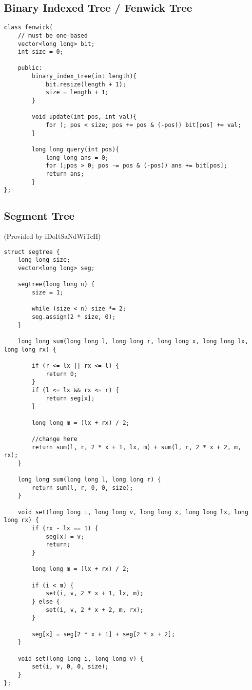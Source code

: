 \documentclass{article}
\begin{document}
\pagebreak
\subsection{Binary Indexed Tree / Fenwick Tree}
\begin{verbatim}
class fenwick{
    // must be one-based
    vector<long long> bit;
    int size = 0;

    public:
        binary_index_tree(int length){
            bit.resize(length + 1);
            size = length + 1;
        }

        void update(int pos, int val){
            for (; pos < size; pos += pos & (-pos)) bit[pos] += val;
        }

        long long query(int pos){
            long long ans = 0;
            for (;pos > 0; pos -= pos & (-pos)) ans += bit[pos];
            return ans;
        }
};
\end{verbatim}

\pagebreak
\subsection{Segment Tree}
(Provided by iDoItSaNdWiTcH)
\begin{verbatim}
struct segtree {
    long long size;
    vector<long long> seg;
    
    segtree(long long n) {
        size = 1;
    
        while (size < n) size *= 2;
        seg.assign(2 * size, 0);
    }
    
    long long sum(long long l, long long r, long long x, long long lx, long long rx) {
        
        if (r <= lx || rx <= l) {
            return 0;
        }
        if (l <= lx && rx <= r) {
            return seg[x];
        }
    
        long long m = (lx + rx) / 2;
    
        //change here
        return sum(l, r, 2 * x + 1, lx, m) + sum(l, r, 2 * x + 2, m, rx);
    }
    
    long long sum(long long l, long long r) {
        return sum(l, r, 0, 0, size);
    }
    
    void set(long long i, long long v, long long x, long long lx, long long rx) {
        if (rx - lx == 1) {
            seg[x] = v;
            return;
        }
    
        long long m = (lx + rx) / 2;
    
        if (i < m) {
            set(i, v, 2 * x + 1, lx, m);
        } else {
            set(i, v, 2 * x + 2, m, rx);
        }
    
        seg[x] = seg[2 * x + 1] + seg[2 * x + 2];
    }
    
    void set(long long i, long long v) {
        set(i, v, 0, 0, size);
    }
};
\end{verbatim}
\end{document}
